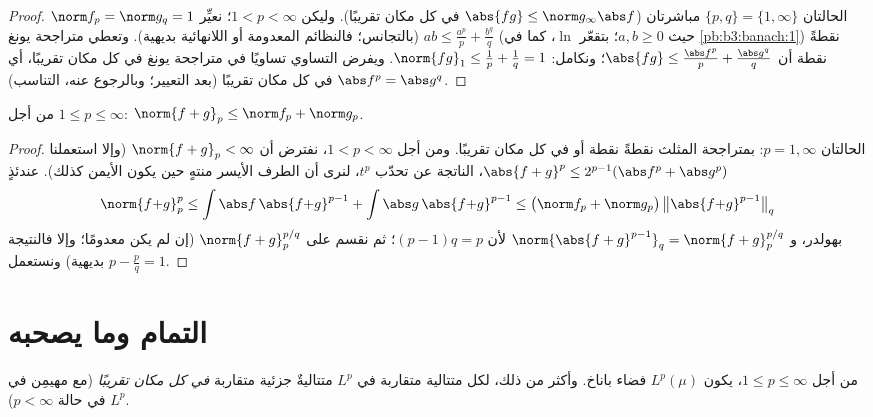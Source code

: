 \begin{proof}
الحالتان $\{p, q\} = \{1, \infty\}$ مباشرتان ($\abs{fg} \leq
\norm g_\infty\abs f$ في كل مكان تقريبًا). وليكن
$1 < p < \infty$؛ نعيِّر $\norm f_p = \norm g_q = 1$ (بالتجانس؛ فالنظائم المعدومة أو
اللانهائية بديهية). وتعطي متراجحة يونغ $ab \leq \frac{a^p}p +
\frac{b^q}q$ (حيث
$a, b \geq 0$؛ بتقعّر $\ln$، كما في \cref{pb:b3:banach:1}) نقطةً نقطة أن
$\abs{f g} \leq
\frac{\abs f^p}p + \frac{\abs g^q}q$؛ ونكامل: $\norm{fg}_1
\leq \frac1p + \frac1q = 1$. ويفرض التساوي تساويًا في متراجحة يونغ
في كل مكان تقريبًا، أي $\abs f^p = \abs g^q$ في كل مكان تقريبًا (بعد التعيير؛
وبالرجوع عنه، التناسب).
\end{proof}

\begin{theorem}\label{thm:b3:lp:minkowski}
من أجل $1 \leq p \leq \infty$: $\norm{f + g}_p \leq \norm f_p +
\norm g_p$.
\end{theorem}

\begin{proof}
الحالتان $p = 1, \infty$: بمتراجحة المثلث نقطةً نقطة أو في كل
مكان تقريبًا. ومن أجل $1 <
p < \infty$، نفترض أن $\norm{f+g}_p < \infty$ (وإلا استعملنا
$\abs{f+g}^p \leq 2^{p-1}(\abs f^p + \abs g^p)$، الناتجة عن تحدّب $t^p$، لنرى أن الطرف الأيسر منتهٍ حين
يكون الأيمن كذلك). عندئذٍ
\[
\norm{f{+}g}_p^p \leq \int\abs f\,\abs{f{+}g}^{p-1} +
\int\abs g\,\abs{f{+}g}^{p-1}
\leq \bigl(\norm f_p + \norm g_p\bigr)\,
\bigl\|\abs{f{+}g}^{p-1}\bigr\|_q
\]
بهولدر، و $\norm{\abs{f+g}^{p-1}}_q =
\norm{f+g}_p^{p/q}$ لأن $(p-1)q = p$؛ ثم نقسم على
$\norm{f+g}_p^{p/q}$ (إن لم يكن معدومًا؛ وإلا فالنتيجة بديهية) ونستعمل $p -
\frac pq = 1$.
\end{proof}

\section{التمام وما يصحبه}

\begin{theorem}\label{thm:b3:lp:complete}
من أجل $1 \leq p \leq \infty$، يكون $L^p(\mu)$ فضاء باناخ. وأكثر من ذلك، لكل
متتالية متقاربة في $L^p$ متتاليةٌ جزئية متقاربة \emph{في كل مكان
تقريبًا} (مع مهيمِن في $L^p$ في
حالة $p < \infty$).
\end{theorem}

